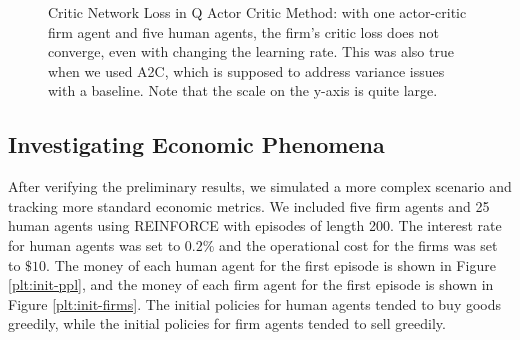 \documentclass[twoside,twocolumn]{article}
\begin{document}
\begin{figure}[h]
\caption{Critic Network Loss in Q Actor Critic Method: with one actor-critic firm agent and five human agents, the firm's critic loss does not converge, even with changing the learning rate. This was also true when we used A2C, which is supposed to address variance issues with a baseline. Note that the scale on the y-axis is quite large.}
\label{plt:acadvloss}
\end{figure}




\subsection{Investigating Economic Phenomena}

After verifying the preliminary results, we simulated a more complex scenario and tracking more standard economic metrics. We included five firm agents and 25 human agents using REINFORCE with episodes of length 200. The interest rate for human agents was set to $0.2\%$ and the operational cost for the firms was set to $\$10$. The money of each human agent for the first episode is shown in Figure \ref{plt:init-ppl}, and the money of each firm agent for the first episode is shown in Figure \ref{plt:init-firms}. The initial policies for human agents tended to buy goods greedily, while the initial policies for firm agents tended to sell greedily.
\end{document}
